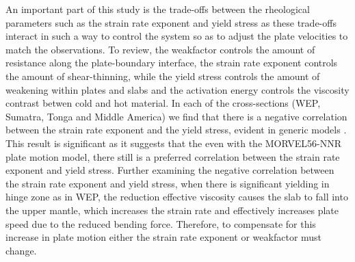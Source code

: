 \documentclass[12pt]{article}
\begin{document}
{  
 
  
  An important part of this study is the trade-offs between the rheological parameters such as the strain rate exponent and yield stress as these trade-offs interact in such a way to control the system so as to adjust the plate velocities to match the observations. To review, the weakfactor controls the amount of resistance along the plate-boundary  interface, the strain rate exponent controls the amount of shear-thinning, while the yield stress controls the amount of weakening within plates and slabs and the activation energy controls the viscosity contrast betwen cold and hot material. In each of the cross-sections (WEP, Sumatra, Tonga and Middle America) we find that there is a negative correlation between the strain rate exponent and the yield stress, evident in generic models \citep{ratnaswamy2015adjoint}. This result is significant as it suggests that the even with the MORVEL56-NNR plate motion model, there still is a preferred correlation between the strain rate exponent and yield stress. Further examining the negative correlation between the strain rate exponent and yield stress, when there is significant yielding in hinge zone as in WEP, the reduction effective viscosity causes the slab to fall into the upper mantle, which increases the strain rate and effectively increases plate speed due to the reduced bending force. Therefore, to compensate for this increase in plate motion either the strain rate exponent or weakfactor must change.
  
}
\end{document}
